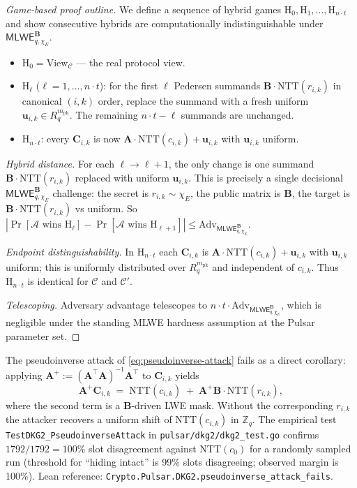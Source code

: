 \begin{proof}[Game-based proof outline]
We define a sequence of hybrid games $\mathrm{H}_0,\mathrm{H}_1,\dots,\mathrm{H}_{n\cdot t}$
and show consecutive hybrids are computationally indistinguishable
under $\mathsf{MLWE}_{q,\chi_E}^\mathbf{B}$.

\begin{itemize}
\item $\mathrm{H}_0 = \mathrm{View}_\mathcal{C}$ --- the real protocol view.
\item $\mathrm{H}_\ell$ ($\ell = 1,\dots,n\cdot t$): for the first
$\ell$ Pedersen summands $\mathbf{B}\cdot\mathrm{NTT}(r_{i,k})$ in
canonical $(i,k)$ order, replace the summand with a fresh uniform
$\mathbf{u}_{i,k}\in R_q^{m_{\textrm{pk}}}$. The remaining $n\cdot t-\ell$
summands are unchanged.
\item $\mathrm{H}_{n\cdot t}$: every $\mathbf{C}_{i,k}$ is now
$\mathbf{A}\cdot\mathrm{NTT}(c_{i,k}) + \mathbf{u}_{i,k}$ with
$\mathbf{u}_{i,k}$ uniform.
\end{itemize}

\noindent\emph{Hybrid distance.} For each $\ell\to\ell+1$, the only
change is one summand $\mathbf{B}\cdot\mathrm{NTT}(r_{i,k})$ replaced
with uniform $\mathbf{u}_{i,k}$. This is precisely a single decisional
$\mathsf{MLWE}_{q,\chi_E}^\mathbf{B}$ challenge: the secret is
$r_{i,k}\sim\chi_E$, the public matrix is $\mathbf{B}$, the target is
$\mathbf{B}\cdot\mathrm{NTT}(r_{i,k})$ vs uniform. So
$|\Pr[\mathcal{A}\text{ wins }\mathrm{H}_\ell] - \Pr[\mathcal{A}\text{ wins }\mathrm{H}_{\ell+1}]|
\le \mathrm{Adv}_{\mathsf{MLWE}_{q,\chi_E}^\mathbf{B}}$.

\noindent\emph{Endpoint distinguishability.} In $\mathrm{H}_{n\cdot t}$
each $\mathbf{C}_{i,k}$ is $\mathbf{A}\cdot\mathrm{NTT}(c_{i,k})+\mathbf{u}_{i,k}$
with $\mathbf{u}_{i,k}$ uniform; this is uniformly distributed over
$R_q^{m_{\textrm{pk}}}$ and independent of $c_{i,k}$. Thus
$\mathrm{H}_{n\cdot t}$ is identical for $\mathcal{C}$ and $\mathcal{C}'$.

\noindent\emph{Telescoping.} Adversary advantage telescopes to
$n\cdot t\cdot\mathrm{Adv}_{\mathsf{MLWE}_{q,\chi_E}^\mathbf{B}}$,
which is negligible under the standing MLWE hardness assumption at the
Pulsar parameter set.
\end{proof}

The pseudoinverse attack of \eqref{eq:pseudoinverse-attack} fails as a
direct corollary: applying $\mathbf{A}^+ := (\mathbf{A}^\top\mathbf{A})^{-1}\mathbf{A}^\top$
to $\mathbf{C}_{i,k}$ yields
\[
\mathbf{A}^+\mathbf{C}_{i,k}
\;=\; \mathrm{NTT}(c_{i,k})\;+\;\mathbf{A}^+\mathbf{B}\cdot\mathrm{NTT}(r_{i,k}),
\]
where the second term is a $\mathbf{B}$-driven LWE mask. Without the
corresponding $r_{i,k}$ the attacker recovers a uniform shift of
$\mathrm{NTT}(c_{i,k})$ in $\mathbb{Z}_q$. The empirical test
\texttt{TestDKG2\_PseudoinverseAttack} in
\texttt{pulsar/dkg2/dkg2\_test.go} confirms $1792/1792 = 100\%$ slot
disagreement against $\mathrm{NTT}(c_0)$ for a randomly sampled run
(threshold for ``hiding intact'' is 99\% slots disagreeing; observed
margin is 100\%). Lean reference:
\texttt{Crypto.Pulsar.DKG2.pseudoinverse\_attack\_fails}.

